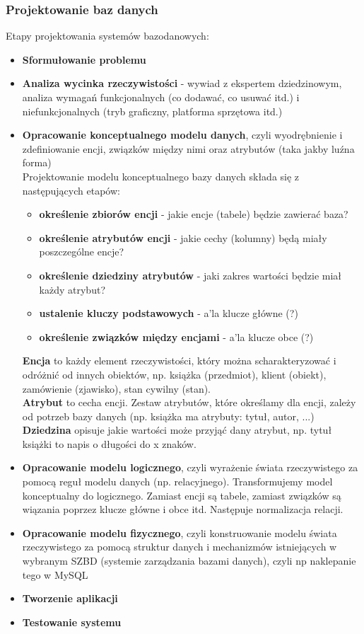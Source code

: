 \documentclass[a4paper,12pt,oneside]{book}
\begin{document}
			\subsubsection{Projektowanie baz danych}
				Etapy projektowania systemów bazodanowych:
				\begin{itemize}
					\item \textbf{Sformułowanie problemu}
					\item \textbf{Analiza wycinka rzeczywistości} - wywiad z ekspertem dziedzinowym, analiza wymagań funkcjonalnych (co dodawać, co usuwać itd.) i niefunkcjonalnych (tryb graficzny, platforma sprzętowa itd.)
					\item \textbf{Opracowanie konceptualnego modelu danych}, czyli wyodrębnienie i zdefiniowanie encji, związków między nimi oraz atrybutów (taka jakby luźna forma) \\
					Projektowanie modelu konceptualnego bazy danych składa się z następujących etapów:
					\begin{itemize}
						\item \textbf{określenie zbiorów encji} - jakie encje (tabele) będzie zawierać baza?
						\item \textbf{określenie atrybutów encji} - jakie cechy (kolumny) będą miały poszczególne encje?
						\item \textbf{określenie dziedziny atrybutów} - jaki zakres wartości będzie miał każdy atrybut?
						\item \textbf{ustalenie kluczy podstawowych} - a'la klucze główne (?)
						\item \textbf{określenie związków między encjami} - a'la klucze obce (?)
					\end{itemize}
					\textbf{Encja} to każdy element rzeczywistości, który można scharakteryzować i odróżnić od innych obiektów, np. książka (przedmiot), klient (obiekt), zamówienie (zjawisko), stan cywilny (stan). \\
					\textbf{Atrybut} to cecha encji. Zestaw atrybutów, które określamy dla encji, zależy od potrzeb bazy danych (np. książka ma atrybuty: tytuł, autor, ...) \\
					\textbf{Dziedzina} opisuje jakie wartości może przyjąć dany atrybut, np. tytuł książki to napis o długości do x znaków.
					\item \textbf{Opracowanie modelu logicznego}, czyli wyrażenie świata rzeczywistego za pomocą reguł modelu danych (np. relacyjnego). Transformujemy model konceptualny do logicznego. Zamiast encji są tabele, zamiast związków są wiązania poprzez klucze główne i obce itd. Następuje normalizacja relacji.
					\item \textbf{Opracowanie modelu fizycznego}, czyli konstruowanie modelu świata rzeczywistego za pomocą struktur danych i mechanizmów istniejących w wybranym SZBD (systemie zarządzania bazami danych), czyli np naklepanie tego w MySQL
					\item \textbf{Tworzenie aplikacji}
					\item \textbf{Testowanie systemu}
				\end{itemize}
				
\end{document}
